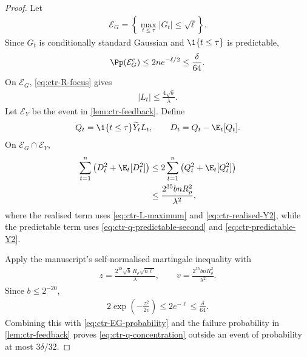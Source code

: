 \begin{proof}
    Let
    \begin{align}
        \mathcal E_G
        =\left\{\max_{t\leq\tau}|G_t|\leq\sqrt\ell\right\}.
    \end{align}
    Since $G_t$ is conditionally standard Gaussian and
    $\1\{t\leq\tau\}$ is predictable,
    \begin{align}
        \Pp(\mathcal E_G^c)
        \leq2ne^{-\ell/2}
        \leq\frac\delta{64}.
        \label{eq:ctr-EG-probability}
    \end{align}
    On $\mathcal E_G$, \eqref{eq:ctr-R-focus} gives
    \begin{align}
        |L_t|
        \leq\frac{4\sqrt b}{\lambda}.
        \label{eq:ctr-L-maximum}
    \end{align}
    Let $\mathcal E_Y$ be the event in \cref{lem:ctr-feedback}.  Define
    \begin{align}
        Q_t=\1\{t\leq\tau\}\widetilde Y_tL_t,
        \qquad
        D_t=Q_t-\E_t[Q_t].
    \end{align}
    On $\mathcal E_G\cap\mathcal E_Y$,
    \begin{align}
        \sum_{t=1}^n\left(D_t^2+\E_t[D_t^2]\right)
         & \leq2\sum_{t=1}^n
        \left(Q_t^2+\E_t[Q_t^2]\right)
        \\
         & \leq\frac{2^{35}bnR_\rho^2}{\lambda^2},
        \label{eq:ctr-q-self-normaliser}
    \end{align}
    where the realised term uses
    \eqref{eq:ctr-L-maximum} and \eqref{eq:ctr-realised-Y2}, while the
    predictable term uses \eqref{eq:ctr-q-predictable-second} and
    \eqref{eq:ctr-predictable-Y2}.

    Apply the manuscript's self-normalised martingale inequality with
    \begin{align}
        z=\frac{2^{18}\sqrt b\,R_\rho\sqrt{n\ell}}\lambda,
        \qquad
        v=\frac{2^{35}bnR_\rho^2}{\lambda^2}.
    \end{align}
    Since $b\leq2^{-20}$,
    \begin{align}
        2\exp\left(-\frac{z^2}{2v}\right)
        \leq2e^{-\ell}
        \leq\frac\delta{64}.
    \end{align}
    Combining this with \eqref{eq:ctr-EG-probability} and the failure
    probability in \cref{lem:ctr-feedback} proves
    \eqref{eq:ctr-q-concentration} outside an event of probability at most
    $3\delta/32$.


\end{proof}
